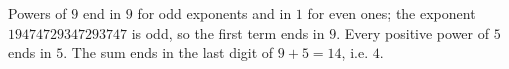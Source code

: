 Powers of $9$ end in $9$ for odd exponents and in $1$ for even ones; the exponent $19474729347293747$ is odd, so the first term ends in $9$. Every positive power of $5$ ends in $5$. The sum ends in the last digit of $9+5=14$, i.e. $\boxed{4}$.
